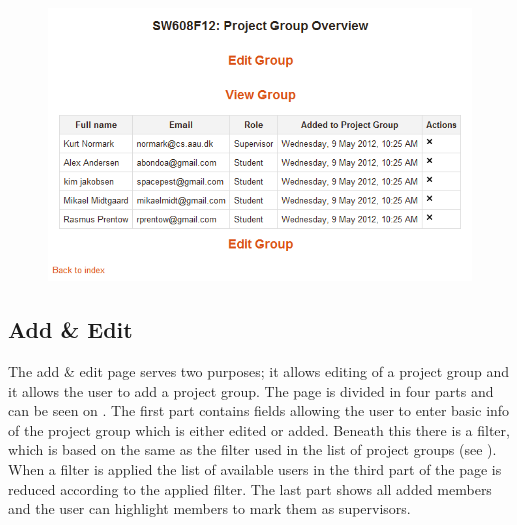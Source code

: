 \begin{figure}
	\centering
		\includegraphics[width=\textwidth]{images/moodleprojectgroupoverview.png}
	\label{fig:moodleprojectgroupoverview}
\end{figure}
\FloatBarrier

\subsection{Add \& Edit}
\label{sec:addandedit}
The add \& edit page serves two purposes; it allows editing of a project group and it allows the user to add a project group.
The page is divided in four parts and can be seen on . 
The first part contains fields allowing the user to enter basic info of the project group which is either edited or added. 
Beneath this there is a filter, which is based on the same as the filter used in the list of project groups (see ). 
When a filter is applied the list of available users in the third part of the page is reduced according to the applied filter. 
The last part shows all added members and the user can highlight members to mark them as supervisors. 


